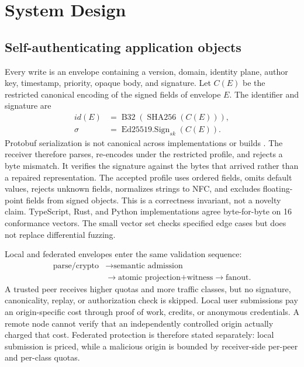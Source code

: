 \documentclass[conference,a4paper]{IEEEtran}
\begin{document}
\section{System Design}

\subsection{Self-authenticating application objects}

Every write is an envelope containing a version, domain, identity plane, author key, timestamp,
priority, opaque body, and signature. Let $C(E)$ be the restricted canonical encoding of the signed
fields of envelope $E$. The identifier and signature are
\begin{equation}
\begin{aligned}
  \mathit{id}(E)&=\operatorname{B32}\!\left(\operatorname{SHA256}(C(E))\right),\\
  \sigma&=\operatorname{Ed25519.Sign}_{sk}(C(E)).
\end{aligned}
\end{equation}
Protobuf serialization is not canonical across implementations or builds
\cite{protobufcanonical}. The receiver therefore parses, re-encodes under the restricted profile,
and rejects a byte mismatch. It verifies the signature against the bytes that arrived rather than a
repaired representation. The accepted profile uses ordered fields, omits default values, rejects
unknown fields, normalizes strings to NFC, and excludes floating-point fields from signed objects.
This is a correctness invariant, not a novelty claim. TypeScript, Rust, and Python implementations
agree byte-for-byte on 16 conformance vectors. The small vector set checks specified edge cases but
does not replace differential fuzzing.

Local and federated envelopes enter the same validation sequence:
\begin{equation}
\begin{aligned}
\text{parse/crypto}&\rightarrow\text{semantic admission}\\
&\rightarrow\text{atomic projection+witness}\rightarrow\text{fanout}.
\end{aligned}
\end{equation}
A trusted peer receives higher quotas and more traffic classes, but no signature, canonicality,
replay, or authorization check is skipped. Local user submissions pay an origin-specific cost through
proof of work, credits, or anonymous credentials. A remote node cannot verify that an independently
controlled origin actually charged that cost. Federated protection is therefore stated separately:
local submission is priced, while a malicious origin is bounded by receiver-side per-peer and
per-class quotas.
\end{document}
